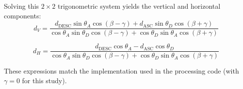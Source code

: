 \documentclass[11pt,a4paper]{article}
\begin{document}
\noindent Solving this $2\times2$ trigonometric system yields the vertical and horizontal components:
\begin{equation}
d_V = \frac{d_{\text{DESC}} \sin\theta_A \cos(\beta - \gamma) + d_{\text{ASC}} \sin\theta_D \cos(\beta + \gamma)}
{\cos\theta_A \sin\theta_D \cos(\beta - \gamma) + \cos\theta_D \sin\theta_A \cos(\beta + \gamma)}
\end{equation}

\begin{equation}
d_H = \frac{d_{\text{DESC}} \cos\theta_A - d_{\text{ASC}} \cos\theta_D}
{\cos\theta_A \sin\theta_D \cos(\beta - \gamma) + \cos\theta_D \sin\theta_A \cos(\beta + \gamma)}
\end{equation}

\noindent These expressions match the implementation used in the processing code (with $\gamma = 0$ for this study).


\end{document}

